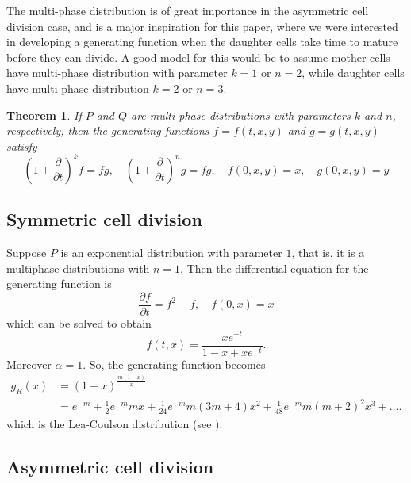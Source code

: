 \documentclass[12pt]{amsart}
\theoremstyle{plain}
\newtheorem{thm}{Theorem}[section]
\theoremstyle{definition}
\theoremstyle{remark}
\theoremstyle{definition}
\begin{document}
The multi-phase distribution is of great importance in the asymmetric cell division case, and is a major inspiration for this paper, where we were interested in developing a generating function when the daughter cells take time to mature before they can divide. A good model for this would be to assume mother cells have multi-phase distribution with parameter $k=1$ or $n=2$, while daughter cells have multi-phase distribution $k=2$ or $n=3$.

\begin{thm} \label{Multiphase}
If $P$ and $Q$ are multi-phase distributions with parameters $k$ and $n$, respectively, then the generating functions $f=f(t,x,y)$ and $g=g(t,x,y)$ satisfy
\begin{equation}
\left(1+ \frac{\partial}{\partial t} \right)^k f = fg, \quad
\left(1+ \frac{\partial}{\partial t} \right)^n g = fg, \quad
f(0,x,y) = x, \quad
g(0,x,y) = y
\end{equation}
\end{thm}

\subsection{Symmetric cell division} \label{singleMutantExamples}

Suppose $P$ is an exponential distribution with parameter $1$, that is, it is a multiphase distributions with $n=1$.  Then the differential equation for the generating function is
\begin{equation}
\frac{\partial f}{\partial t} = f^2 - f, \quad
f(0,x) = x
\end{equation}
which can be solved to obtain
\begin{equation}
f(t,x) = \frac{xe^{-t}}{1-x+xe^{-t}}.
\end{equation}
Moreover $\alpha = 1$.  So, the generating function becomes
\begin{equation}
\begin{aligned}
g_R(x) &= \left( 1-x \right)^{\frac{m (1-x)}{x}} \\
&= e^{-m}+\frac{1}{2} e^{-m} m x+\frac{1}{24} e^{-m} m (3 m+4) x^2+\frac{1}{48} e^{-m} m (m+2)^2 x^3+ \dots .
\end{aligned}
\end{equation}
which is the Lea-Coulson distribution (see \cite{leaCoulson}).

\subsection{Asymmetric cell division} \label{multiMutantExamples}
\end{document}
